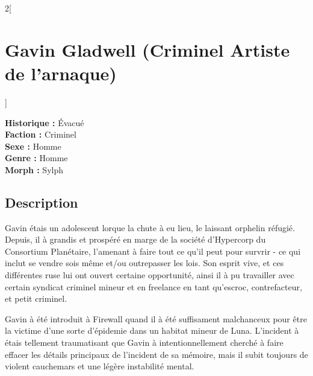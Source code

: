 \documentclass[a4paper,9pt]{article}
\begin{document}
\newpage

\begin{multicols}{2}[\section*{Gavin Gladwell (Criminel Artiste de l'arnaque)}]
   
   \noindent\textbf{Historique :} Évacué\\
   \noindent\textbf{Faction :} Criminel\\
   \noindent\textbf{Sexe :} Homme\\
   \noindent\textbf{Genre :} Homme\\
   \noindent\textbf{Morph :} Sylph\\

   \subsection*{Description}

   Gavin étais un adolescent lorque la chute à eu lieu, le laissant orphelin réfugié.
   Depuis, il à grandis et prospéré en marge de la société d'Hypercorp du
   Consortium Planétaire, l'amenant à faire tout ce qu'il peut pour survrir - ce
   qui inclut se vendre sois même et/ou outrepasser les lois.
   Son esprit vive, et ces différentes ruse lui ont ouvert certaine opportunité,
   ainsi il à pu travailler avec certain syndicat criminel mineur et en freelance
   en tant qu'escroc, contrefacteur, et petit criminel.

   Gavin à été introduit à Firewall quand il à été suffisament malchanceux pour
   être la victime d'une sorte d'épidemie dans un habitat mineur de Luna.
   L'incident à étais tellement traumatisant que Gavin à intentionnellement
   cherché à faire effacer les détails principaux de l'incident de sa mémoire,
   mais il subit toujours de violent cauchemars et une légère instabilité mental.


\end{multicols}
\end{document}
